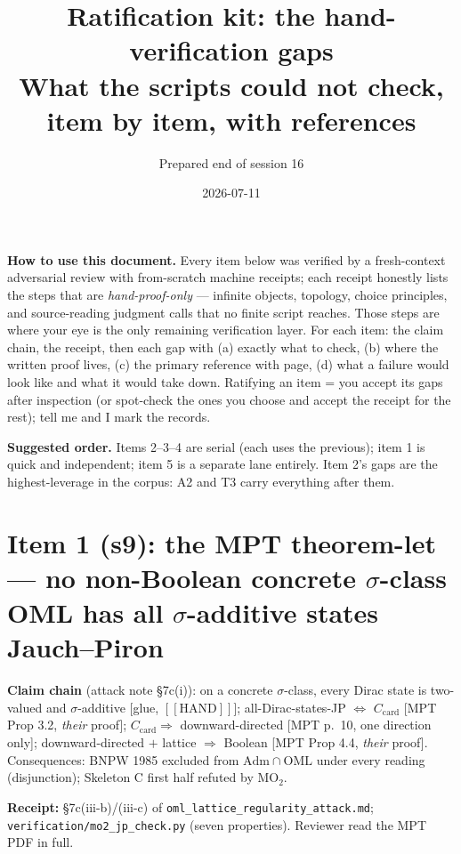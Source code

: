 \documentclass[11pt]{article}
\title{Ratification kit: the hand-verification gaps\\
\large What the scripts could not check, item by item, with references}
\author{Prepared end of session 16}
\date{2026-07-11}
\newcommand{\HAND}{\ensuremath{[\![\text{HAND}]\!]}}
\newcommand{\file}[1]{\texttt{\small #1}}
\begin{document}
\maketitle

\noindent\textbf{How to use this document.} Every item below was
verified by a fresh-context adversarial review with from-scratch
machine receipts; each receipt honestly lists the steps that are
\emph{hand-proof-only} --- infinite objects, topology, choice
principles, and source-reading judgment calls that no finite script
reaches. Those steps are where your eye is the only remaining
verification layer. For each item: the claim chain, the receipt, then
each gap with (a) exactly what to check, (b) where the written proof
lives, (c) the primary reference with page, (d) what a failure would
look like and what it would take down. Ratifying an item = you accept
its gaps after inspection (or spot-check the ones you choose and
accept the receipt for the rest); tell me and I mark the records.

\smallskip
\noindent\textbf{Suggested order.} Items 2--3--4 are serial (each uses
the previous); item 1 is quick and independent; item 5 is a separate
lane entirely. Item 2's gaps are the highest-leverage in the corpus:
A2 and T3 carry everything after them.

\tableofcontents

\section{Item 1 (s9): the MPT theorem-let --- no non-Boolean concrete
$\sigma$-class OML has all $\sigma$-additive states Jauch--Piron}

\noindent\textbf{Claim chain} (attack note \S7c(i)):
on a concrete $\sigma$-class, every Dirac state is two-valued and
$\sigma$-additive [glue, \HAND]; all-Dirac-states-JP
$\Leftrightarrow$ $C_{\mathrm{card}}$ [MPT Prop 3.2, \emph{their}
proof]; $C_{\mathrm{card}} \Rightarrow$ downward-directed [MPT p.~10,
one direction only]; downward-directed $+$ lattice $\Rightarrow$
Boolean [MPT Prop 4.4, \emph{their} proof]. Consequences: BNPW 1985
excluded from $\mathrm{Adm}\cap\mathrm{OML}$ under every reading
(disjunction); Skeleton C first half refuted by MO$_2$.

\noindent\textbf{Receipt:} \S7c(iii-b)/(iii-c) of
\file{oml\_lattice\_regularity\_attack.md};
\file{verification/mo2\_jp\_check.py} (seven properties). Reviewer
read the MPT PDF in full.
\end{document}
